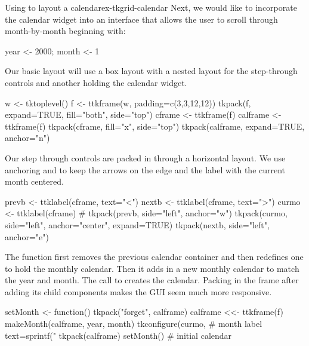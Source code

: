 \begin{example}{Using  to layout a calendar}{ex-tkgrid-calendar}
Next, we would like to incorporate the calendar widget into an interface
that allows the user to scroll through month-by-month beginning with:
\begin{Schunk}
\begin{Sinput}
 year <- 2000; month <- 1
\end{Sinput}
\end{Schunk}

Our basic layout will use a box layout with a nested layout
for the step-through controls and another holding the calendar widget.
\begin{Schunk}
\begin{Sinput}
 w <- tktoplevel()
 f <- ttkframe(w, padding=c(3,3,12,12))
 tkpack(f, expand=TRUE, fill="both", side="top")
 cframe <- ttkframe(f)
 calframe <- ttkframe(f)
 tkpack(cframe, fill="x", side="top")
 tkpack(calframe, expand=TRUE, anchor="n")
\end{Sinput}
\end{Schunk}

Our step through controls are packed in through a horizontal
layout. We use anchoring and  to keep the arrows on the edge and the
label with the current month centered.
\begin{Schunk}
\begin{Sinput}
 prevb <- ttklabel(cframe, text="<")
 nextb <- ttklabel(cframe, text=">")
 curmo <- ttklabel(cframe)
 #
 tkpack(prevb, side="left", anchor="w")
 tkpack(curmo, side="left", anchor="center", expand=TRUE)
 tkpack(nextb, side="left", anchor="e")
\end{Sinput}
\end{Schunk}

The  function first removes the previous calendar
container and then
redefines one to hold the monthly calendar. Then it adds in a new
monthly calendar to match the year and month. The call to
 creates the calendar. Packing in the frame after
adding its child components makes the GUI seem much more responsive.
\begin{Schunk}
\begin{Sinput}
 setMonth <- function() {
   tkpack("forget", calframe)
   calframe <<- ttkframe(f)
   makeMonth(calframe, year, month)
   tkconfigure(curmo,                    # month label
               text=sprintf("%
   tkpack(calframe)
 }
 setMonth()                              # initial calendar
\end{Sinput}
\end{Schunk}


\end{example}
